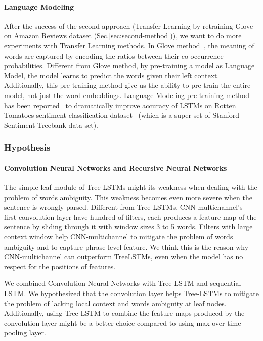 \paragraph{Language Modeling}
After the success of the second approach (Transfer Learning by retraining Glove on Amazon Reviews dataset (Sec.\ref{sec:second-method})), we want to do more experiments with Transfer Learning methods.
In Glove method~\cite{glove}, the meaning of words are captured by encoding the ratios between their co-occurrence probabilities.
Different from Glove method, by pre-training a model as Language Model, the model learns to predict the words given their left context.
Additionally, this pre-training method give us the ability to pre-train the entire model, not just the word embeddings.
Language Modeling pre-training method has been reported~\cite{semisup-seq2seq} to dramatically improve accuracy of LSTMs on Rotten Tomatoes sentiment classification dataset~\cite{Rotten-Tomato} (which is a super set of Stanford Sentiment Treebank data set).

\subsubsection{Hypothesis}
\paragraph{Convolution Neural Networks and Recursive Neural Networks}
The simple leaf-module of Tree-LSTMs might its weakness when dealing with the problem of words ambiguity.
This weakness becomes even more severe when the sentence is wrongly parsed.
Different from Tree-LSTMs, CNN-multichannel's~\cite{KimCNN} first convolution layer have hundred of filters, each produces a feature map of the sentence by sliding through it with window sizes 3 to 5 words.
Filters with large context window help CNN-multichannel to mitigate the problem of words ambiguity and to capture phrase-level feature.
We think this is the reason why CNN-multichannel  can outperform TreeLSTMs, even when the model has no respect for the positions of features.

We combined Convolution Neural Networks with Tree-LSTM and sequential LSTM.
We hypothesized that the convolution layer helps Tree-LSTMs to mitigate the problem of lacking local context and words ambiguity at leaf nodes.
Additionally, using Tree-LSTM to combine the feature maps produced by the convolution layer might be a better choice compared to using max-over-time pooling layer.
